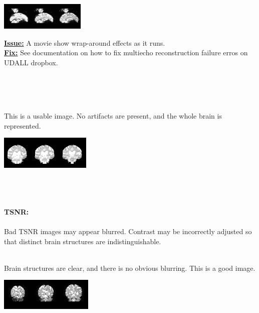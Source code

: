 \documentclass[12pt]{article}
\begin{document}
\noindent\begin{minipage}{0.45\textwidth}
	\includegraphics[scale=1.3]{bad_image5.png}
\end{minipage}%
\hfill%
\begin{minipage}{0.45\textwidth}
	\underline{\textbf{Issue:}} A movie show wrap-around effects as it runs. \\
	\underline{\textbf{Fix:}} See documentation on how to fix multiecho reconstruction failure erros on UDALL dropbox.
\end{minipage}\\\\\\
\noindent\begin{minipage}{0.45\textwidth}
	This is a usable image. No artifacts are present, and the whole brain is represented.
\end{minipage}%
\hfill%
\begin{minipage}{0.45\textwidth}
	\includegraphics[scale=1.2]{meica_good2.png}
\end{minipage}
\\\\\\
\large{\textbf{TSNR:}}
\\\\
Bad TSNR images may appear blurred. Contrast may be incorrectly adjusted so that distinct brain structures are indistinguishable. \\\\
\noindent\begin{minipage}{0.45\textwidth}
	Brain structures are clear, and there is no obvious blurring. This is a good image.
\end{minipage}%
\hfill%
\begin{minipage}{0.45\textwidth}
	\includegraphics[scale=1.25]{tsnr_good2.png}
\end{minipage}\\\\
\end{document}
